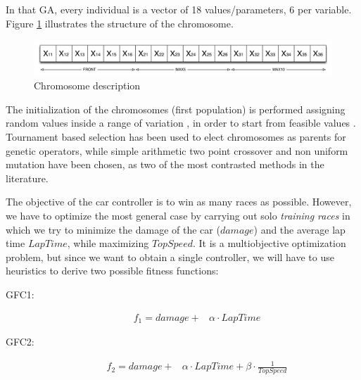 \documentclass[sigconf]{acmart}
\begin{document}
In that GA, every individual is a vector of 18 values/parameters, 6 per variable. Figure \ref {fig:cromosome} illustrates the structure of the chromosome.
\begin{figure}[!ht]	
  \begin{center}
    \includegraphics[width=12cm]{fig/chromosome2.png}
    \caption{Chromosome description}
    \label{fig:cromosome}	
  \end{center}	
\end{figure}

The initialization of the chromosomes (first population) is performed
assigning random values inside a range of variation
\cite{GAs_Goldberg89}, in order to start from feasible values
\cite{evo17}. 
Tournament based selection has been used to elect chromosomes as
parents for genetic operators, while simple arithmetic two point
crossover \cite{crossGA2017} and non uniform mutation
\cite{mutation1997} have been chosen, as two of the most contrasted
methods in the literature. 



The objective of the car controller is to win as many races as
possible. However, we have to optimize the most general case by
carrying out
solo {\em training races} in which we try to minimize the damage of
the car ($damage$) and the average lap time $LapTime$, while
maximizing $TopSpeed$. It is a multiobjective optimization problem,
but since we want to obtain a single controller, we will have to use
heuristics to derive two possible fitness functions:

\begin{description}
	\item[GFC1:]  
	\begin{equation} \label{fit1}
	\begin{array}{ll}
	f_{1} =   damage + &\alpha \cdot LapTime 
	\end{array}
	\end{equation}
	\item[GFC2:] 
	\begin{equation} \label{fit2}
	\begin{array}{lll}
	f_{2}= damage + &\alpha \cdot  LapTime + \beta \cdot \frac{1}{TopSpeed}
	\end{array}
	\end{equation}	
\end{description} %
\end{document}
